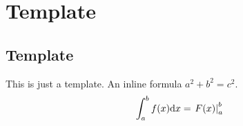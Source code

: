 \chapter{Template}
\section{Template}
This is just a template. An inline formula $a^2 + b^2 = c^2$. 
\begin{equation}
	\int_a^b f(x)\mathrm{d} x = \left. F(x) \right|_a^b
\end{equation}